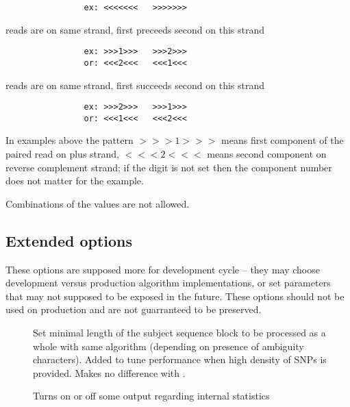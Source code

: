 \documentclass[english,letter]{article}
\begin{document}
\begin{description}
\begin{description}
	\begin{verbatim}
                ex: <<<<<<<   >>>>>>>
	\end{verbatim}
	\item[i\Bar incr\Bar incremental\Bar solid]
				reads are on same strand, first preceeds second on this strand
	\begin{verbatim}
                ex: >>>1>>>   >>>2>>>
                or: <<<2<<<   <<<1<<<
	\end{verbatim}
	\item[d\Bar decr\Bar decremental]
				reads are on same strand, first succeeds second on this strand
	\begin{verbatim}
                ex: >>>2>>>   >>>1>>>
                or: <<<1<<<   <<<2<<<
	\end{verbatim}
	\end{description}

                In examples above the pattern $>>>1>>>$ means first component of 
                the paired read on plus strand, $<<<2<<<$ means second component 
                on reverse complement strand; if the digit is not set then the
                component number does not matter for the example.

                Combinations of the values are not allowed.
\end{description}

\subsection{Extended options}
    These options are supposed more for development cycle -- they may choose 
    development versus production algorithm implementations, or set parameters 
    that may not supposed to be exposed in the future. These options should 
    not be used on production and are not guarranteed to be preserved.
\begin{description}
\item[]
                Set minimal length of the subject sequence block to be 
                processed as a whole with same algorithm (depending on 
                presence of ambiguity characters).  Added to tune 
                performance when high density of SNPs is provided. Makes
                no difference with .
\item[]
	Turns on or off some output regarding internal  statistics
\end{description}
\end{document}
